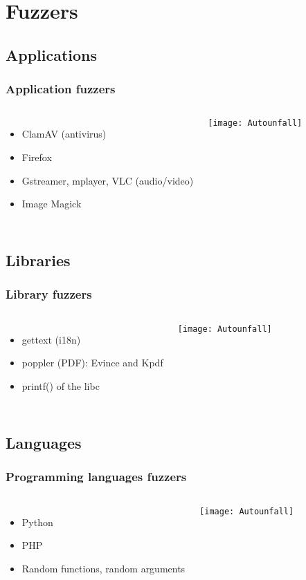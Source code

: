 \section{Fuzzers}

\subsection{Applications}
\frame
{
    \frametitle{Application fuzzers}
    \begin{columns}[c]
        \column{2.5in}
          \begin{itemize}
          \item ClamAV (antivirus)
          \item Firefox
          \item Gstreamer, mplayer, VLC (audio/video)
          \item Image Magick
          \end{itemize}

        \column{2.3in}
            \texttt{[image: Autounfall]}
    \end{columns}
}

\subsection{Libraries}
\frame
{
    \frametitle{Library fuzzers}
    \begin{columns}[c]
        \column{2.5in}
            \begin{itemize}
            \item gettext (i18n)
            \item poppler (PDF): Evince and Kpdf
            \item printf() of the libc
            \end{itemize}

        \column{2.3in}
            \texttt{[image: Autounfall]}
    \end{columns}
}

\subsection{Languages}
\frame
{
    \frametitle{Programming languages fuzzers}
    \begin{columns}[c]
        \column{2.5in}
            \begin{itemize}
            \item Python
            \item PHP
            \item Random functions, random arguments
            \end{itemize}

        \column{2.3in}
            \texttt{[image: Autounfall]}
    \end{columns}
}


